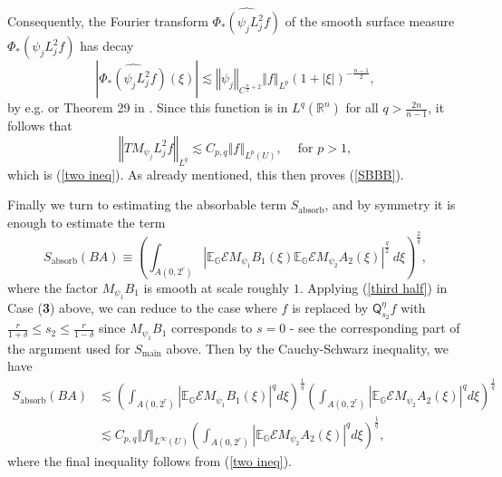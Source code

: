 \documentclass{amsart}%
\theoremstyle{plain}
\numberwithin{equation}{section}
\begin{document}
Consequently, the Fourier transform $\widehat{\Phi_{\ast}\left(  \psi_{j}%
L_{j}^{2}f\right)  }$ of the smooth surface measure $\Phi_{\ast}\left(
\psi_{j}L_{j}^{2}f\right)  $ has decay
\[
\left\vert \widehat{\Phi_{\ast}\left(  \psi_{j}L_{j}^{2}f\right)  }\left(
\xi\right)  \right\vert \lesssim\left\Vert \psi_{j}\right\Vert _{C^{\frac
{n}{2}+2}}\left\Vert f\right\Vert _{L^{p}}\left(  1+\left\vert \xi\right\vert
\right)  ^{-\frac{n-1}{2}},
\]
by e.g. \cite[Theorem 1 page 348]{Ste2} or Theorem 29 in \cite{Saw7}. Since
this function is in $L^{q}\left(  \mathbb{R}^{n}\right)  $ for all
$q>\frac{2n}{n-1}$, it follows that%
\[
\left\Vert TM_{\psi_{j}}L_{j}^{2}f\right\Vert _{L^{q}}\lesssim C_{p,q}%
\left\Vert f\right\Vert _{L^{p}\left(  U\right)  },\ \ \ \ \text{\ for }p>1,
\]
which is (\ref{two ineq}). As already mentioned, this then proves (\ref{SBBB}).

Finally we turn to estimating the absorbable term $S_{\operatorname*{absorb}}%
$, and by symmetry it is enough to estimate the term%
\[
S_{\operatorname*{absorb}}\left(  BA\right)  \equiv\left(  \int_{A\left(
0,2^{r}\right)  }\left\vert \mathbb{E}_{\mathbb{G}}\mathcal{E}M_{\psi_{1}%
}B_{1}\left(  \xi\right)  \mathbb{E}_{\mathbb{G}}\mathcal{E}M_{\psi_{2}}%
A_{2}\left(  \xi\right)  \right\vert ^{\frac{q}{2}}\ d\xi\right)  ^{\frac
{2}{q}},
\]
where the factor $M_{\psi_{1}}B_{1}$ is smooth at scale roughly $1$. Applying
(\ref{third half}) in Case (\textbf{3}) above, we can reduce to the case where
$f$ is replaced by $\mathsf{Q}_{s_{2}}^{\eta}f$ with $\frac{r}{1+\delta}\leq
s_{2}\leq\frac{r}{1-\delta}$ since $M_{\psi_{1}}B_{1}$ corresponds to $s=0$ -
see the corresponding part of the argument used for $S_{\operatorname*{main}}$
above. Then by the Cauchy-Schwarz inequality, we have%
\begin{align*}
S_{\operatorname*{absorb}}\left(  BA\right)   & \lesssim\left(  \int_{A\left(
0,2^{r}\right)  }\left\vert \mathbb{E}_{\mathbb{G}}\mathcal{E}M_{\psi_{1}%
}B_{1}\left(  \xi\right)  \right\vert ^{q}d\xi\right)  ^{\frac{1}{q}}\left(
\int_{A\left(  0,2^{r}\right)  }\left\vert \mathbb{E}_{\mathbb{G}}%
\mathcal{E}M_{\psi_{2}}A_{2}\left(  \xi\right)  \right\vert ^{q}d\xi\right)
^{\frac{1}{q}}\\
& \lesssim C_{p,q}\left\Vert f\right\Vert _{L^{\infty}\left(  U\right)
}\left(  \int_{A\left(  0,2^{r}\right)  }\left\vert \mathbb{E}_{\mathbb{G}%
}\mathcal{E}M_{\psi_{2}}A_{2}\left(  \xi\right)  \right\vert ^{q}d\xi\right)
^{\frac{1}{q}},
\end{align*}
where the final inequality follows from (\ref{two ineq}).
\end{document}
